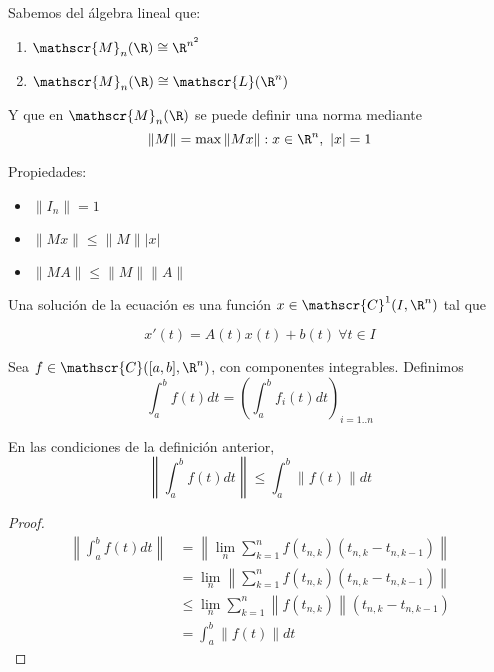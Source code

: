 \begin{nota} Sabemos del álgebra lineal que:

  \begin{enumerate}
  \item $\mathscr{M}_n (\R) \cong \R ^{n^2}$
  \item $\mathscr{M}_n (\R) \cong \mathscr{L}(\R^n)$
  \end{enumerate}

  Y que en $\mathscr{M}_n(\R)$ se puede definir una norma mediante
  \[
  \|M\| = \max { \|Mx\| : x \in \R ^n , \ |x| = 1}
  \]

  Propiedades:

  \begin{itemize}
  \item $\|I_n \| = 1$
  \item $ \|Mx\| \leq \|M\| |x|$
  \item $ \|MA\| \leq \|M\| \|A\|$
  \end{itemize}

\end{nota}

\begin{ndef}

  Una solución de la ecuación es una función $x \in \mathscr{C}^1 (I, \R ^n )$ tal que

  \[x'(t) = A(t) x(t) + b(t) \ \forall t \in I\]

\end{ndef}

\begin{ndef}
  Sea $f\in \mathscr{C}([a,b], \R ^n )$, con componentes integrables. Definimos
  \[ \int_a ^b f(t) dt = \left(\int _a ^b f_i (t) dt\right) _{i = 1..n} \]
\end{ndef}

\begin{nprop}
  En las condiciones de la definición anterior,
  \[ \left\|\int _a ^b f(t) dt\right\| \leq \int_a ^b \|f(t)\| dt \]
\end{nprop}

\begin{proof}
\begin{align*}
  \left\|\int _a ^b f(t) dt\right\| &=  \left\| \lim_n \sum_{k=1}^n f(t_{n,k})(t_{n,k} - t_{n,k-1}) \right\|\\
  & = \lim_n \left\|  \sum_{k=1}^n f(t_{n,k})(t_{n,k} - t_{n,k-1}) \right\|\\
  & \le \lim_n  \sum_{k=1}^n \left\| f(t_{n,k}) \right\|(t_{n,k} - t_{n,k-1})\\
  & = \int_a ^b \|f(t)\| dt
\end{align*}
\end{proof}

